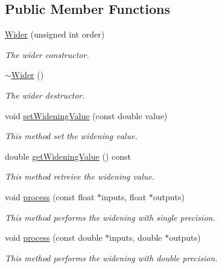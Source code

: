 \subsection*{Public Member Functions}
\begin{DoxyCompactItemize}
\item 
\hyperlink{class_hoa2_d_1_1_wider_a847bbdfd81f552b4b246276582519e9a}{Wider} (unsigned int order)
\begin{DoxyCompactList}\small\item\em The wider constructor. \end{DoxyCompactList}\item 
\hyperlink{class_hoa2_d_1_1_wider_a350dd3e9918f7fdaa977fe5c56db98d1}{$\sim$\-Wider} ()
\begin{DoxyCompactList}\small\item\em The wider destructor. \end{DoxyCompactList}\item 
void \hyperlink{class_hoa2_d_1_1_wider_af43a64e22d453bd5bf6f2d46013fe758}{set\-Widening\-Value} (const double value)
\begin{DoxyCompactList}\small\item\em This method set the widening value. \end{DoxyCompactList}\item 
double \hyperlink{class_hoa2_d_1_1_wider_a6de242ad21bc1197433b23b746e73c8b}{get\-Widening\-Value} () const 
\begin{DoxyCompactList}\small\item\em This method retreive the widening value. \end{DoxyCompactList}\item 
void \hyperlink{class_hoa2_d_1_1_wider_a5183122d315e15a73e5cfe709914e72d}{process} (const float $\ast$inputs, float $\ast$outputs)
\begin{DoxyCompactList}\small\item\em This method performs the widening with single precision. \end{DoxyCompactList}\item 
void \hyperlink{class_hoa2_d_1_1_wider_a40ed4da484d0cac0a730d4eec723327e}{process} (const double $\ast$inputs, double $\ast$outputs)
\begin{DoxyCompactList}\small\item\em This method performs the widening with double precision. \end{DoxyCompactList}\end{DoxyCompactItemize}


